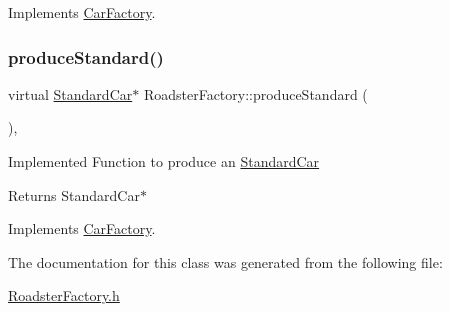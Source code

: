 Implements \mbox{\hyperlink{class_car_factory_a6ea0703f2e692c09dea7a3602836410f}{Car\+Factory}}.

\mbox{\label{class_roadster_factory_a127974ae0ff6bdabdf628b920ee2e518}} 
\subsubsection{\texorpdfstring{produce\+Standard()}{produceStandard()}}
{\footnotesize\ttfamily virtual \mbox{\hyperlink{class_standard_car}{Standard\+Car}}$\ast$ Roadster\+Factory\+::produce\+Standard (\begin{DoxyParamCaption}{ }\end{DoxyParamCaption})\hspace{0.3cm}{\ttfamily [inline]}, {\ttfamily [virtual]}}

Implemented Function to produce an \mbox{\hyperlink{class_standard_car}{Standard\+Car}} \begin{DoxyReturn}{Returns}
Standard\+Car$\ast$ 
\end{DoxyReturn}


Implements \mbox{\hyperlink{class_car_factory_a34ffd5237b689fa31a9a593796d296f2}{Car\+Factory}}.



The documentation for this class was generated from the following file\+:\begin{DoxyCompactItemize}
\item 
\mbox{\hyperlink{_roadster_factory_8h}{Roadster\+Factory.\+h}}\end{DoxyCompactItemize}
